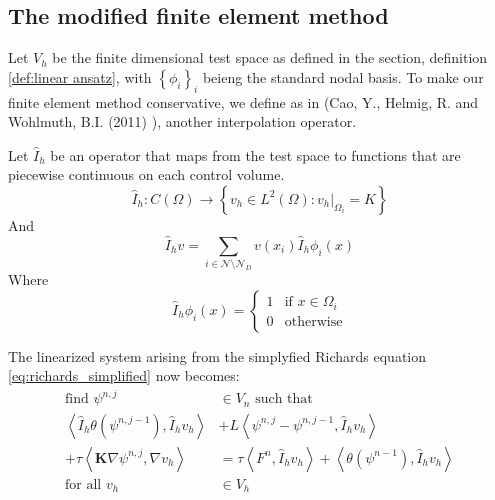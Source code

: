 \documentclass[../Main/main.tex]{subfiles}
\begin{document}
	\subsection*{The modified finite element method}
	Let $V_h$ be the finite dimensional test space as defined in the  section, definition \ref{def:linear ansatz}, with $\left \{ \phi_i \right \}_i$ beieng the standard nodal basis. 
	To make our finite element method conservative, we define as in (Cao, Y., Helmig, R. and Wohlmuth, B.I. (2011) \cite{https://doi.org/10.1002/fld.1926}), another interpolation operator.
	\begin{definition}
		Let $\hat{I}_h$ be an operator that maps from the test space to functions that are piecewise continuous on each control volume.
		\begin{equation*}
			\hat{I}_h:C(\Omega)\rightarrow \left \{ v_h \in L^2(\Omega):v_h|_{\Omega_i} = K \right \}
		\end{equation*}
	And
	\begin{equation*}
		\hat{I}_h v = \sum_{i\in \mathcal{N}\setminus \mathcal{N}_D}v(x_i)\hat{I}_h\phi_i(x)
	\end{equation*}
	Where
	\begin{equation}
		\hat{I}_h\phi_i(x)=\left\{\begin{matrix}
			1 & \text{if } x\in \Omega_i\\ 
			0 & \text{otherwise}
		\end{matrix}\right.
	\end{equation}
	\end{definition}
	The linearized system arising from the simplyfied Richards equation \eqref{eq:richards_simplified} now becomes:
	\begin{equation}\label{eq:richards_L}
		\begin{aligned}
			\text{find }\psi^{n,j}&\in V_n \text{ such that }\\
			\left \langle \hat{I}_h \theta(\psi^{n,j-1}),\hat{I}_h v_h \right \rangle &+L\left \langle \psi^{n,j}-\psi^{n,j-1},\hat{I}_h v_h \right \rangle  \\+ \tau \left \langle \pmb{K}\nabla \psi^{n,j},\nabla v_h  \right \rangle &= \tau \left \langle F^n,\hat{I}_h v_h \right \rangle + \left \langle \theta(\psi^{n-1}),\hat{I}_h v_h \right \rangle\\
			\text{for all }v_h &\in V_h
		\end{aligned}
	\end{equation}
\end{document}
